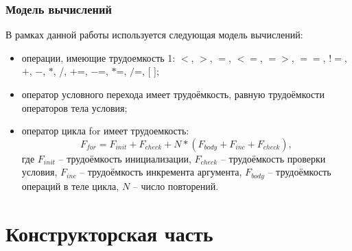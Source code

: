 \documentclass[12pt, a4paper]{report}
\begin{document}
	\subsection{Модель вычислений}
	В рамках данной работы используется следующая модель вычислений:
	\begin{itemize}
		\item операции, имеющие трудоемкость 1: $<$, $>$, $=$, $<=$, $=>$, $==$, $!=$,$+$, $-$, $\ast$, /, $+$=, $-$=, $\ast$=, $/$=, [ ];
		\item оператор условного перехода имеет трудоёмкость, равную трудоёмкости операторов тела условия;
		\item оператор цикла for имеет трудоемкость:
		\begin{equation}
		\label{for_cost}
		F_{for} = F_{init} + F_{check} + N \ast (F_{body} + F_{inc} + F_{check}),
		\end{equation}
		где $F_{init}$ -- трудоёмкость инициализации, $F_{check}$ -- трудоёмкость проверки условия, $F_{inc}$ -- трудоёмкость инкремента аргумента, $F_{body}$ -- трудоёмкость операций в теле цикла, $N$ -- число повторений. ~\cite{AlgAnalysis}
	\end{itemize} 
	

	\chapter{Конструкторская часть}
	
\end{document}
